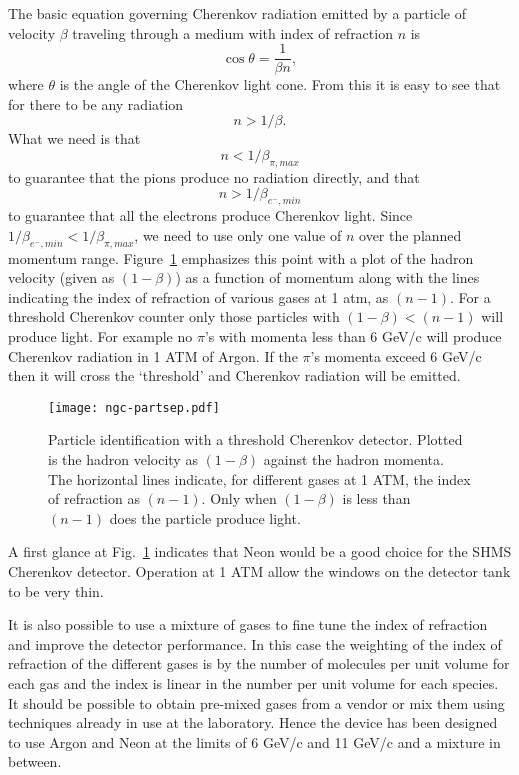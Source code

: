 {The basic equation  governing Cherenkov radiation emitted by a particle
of velocity $\beta$ traveling through a medium with index of refraction
$n$ is \begin{equation}\cos \theta = \frac{1}{\beta n},\end{equation}
where $\theta$ is the angle of the Cherenkov light cone.
From this it is easy to see that for there to be any radiation
$$n > 1/\beta.$$ What we need is that
\begin{equation} n < 1/\beta_{\pi,max}\label{eq:index} \end{equation}
to guarantee that the pions produce no radiation directly, and that
\begin{equation} n > 1/\beta_{e^-,min} \end{equation}
to guarantee that all the electrons produce Cherenkov light. Since
$1/\beta_{e^-,min} < 1/\beta_{\pi,max}$, we need to use only one value
of $n$ over the planned momentum range. Figure~\ref{fig:partsep}
emphasizes this point with a plot of the hadron velocity (given as
$(1-\beta)$) as a function of momentum along with the lines indicating
the index of refraction of various gases at 1 atm, as $(n-1)$.  For a
threshold Cherenkov counter only those particles with $(1-\beta) <
(n-1)$ will produce light. For example no $\pi$'s with momenta less
than 6 GeV/c will produce Cherenkov radiation in 1 ATM of Argon. If the
$\pi$'s momenta exceed 6 GeV/c then it will cross the `threshold' and
Cherenkov radiation will be emitted.
 \begin{figure}[!h] %
   \centering
   \texttt{[image: ngc-partsep.pdf]}
   \caption{Particle identification with a threshold Cherenkov
     detector. Plotted is the hadron velocity as $(1-\beta)$ against
     the hadron momenta. The horizontal lines indicate, for different
     gases at 1 ATM, the index of refraction as $(n-1)$. Only when
     $(1-\beta)$ is less than $(n-1)$ does the particle produce
     light.}
   \label{fig:partsep}
\end{figure}
A first glance at Fig.~\ref{fig:partsep} indicates that Neon would be
a good choice for the SHMS Cherenkov detector. Operation at 1 ATM allow
the windows on the detector tank to be very thin.

It is also possible to use a mixture of gases to fine tune the index
of refraction and improve the detector performance. In this case the
weighting of the index of refraction of the different gases is by the
number of molecules per unit volume for each gas and the index is
linear in the number per unit volume for each species. It should be
possible to obtain pre-mixed gases from a vendor or mix them using
techniques already in use at the laboratory. Hence the device has been
designed to use Argon and Neon at the limits of 6 GeV/c and 11 GeV/c
and a mixture in between.


}
